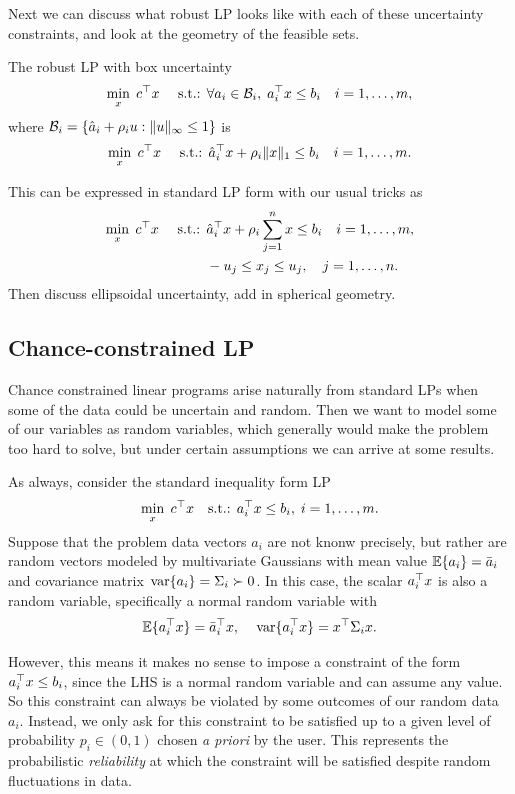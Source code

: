 \documentclass[11 pt]{scrartcl}
\begin{document}
Next we can discuss what robust LP looks like with each of these uncertainty constraints, and look at the geometry of the feasible sets. 

The robust LP with box uncertainty 
\begin{align*}
    \min_x\; c^\top x \quad\text{ s.t.: } \forall a_i\in \mathcal B_i,\; a_i^\top x \leq b_i \quad i = 1,\dots, m,
\end{align*}
where $\mathcal B_i = \{\hat{a}_i + \rho_i u : \|u\|_\infty \leq 1\}$ is 
\begin{align*}
    \min_x\; c^\top x \quad\text{ s.t.: } \hat{a}_i^\top x + \rho_i\|x\|_1 \leq b_i \quad i = 1,\dots, m.
\end{align*}

This can be expressed in standard LP form with our usual tricks as 
\begin{align*}
    \min_x\; c^\top x \quad\text{ s.t.: } &\hat{a}_i^\top x + \rho_i\sum_{j=1}^nx \leq b_i \quad i = 1,\dots, m, \\
                                        & -u_j \leq x_j \leq u_j, \quad j = 1, \dots, n.
\end{align*}
Then discuss ellipsoidal uncertainty, add in spherical geometry.

\subsection{Chance-constrained LP}
Chance constrained linear programs arise naturally from standard LPs when some of the data could be uncertain and random. 
Then we want to model some of our variables as random variables, which generally would make the problem too hard to solve, but under certain assumptions we can arrive at some results.

As always, consider the standard inequality form LP 
\[ \min_x\; c^\top x \quad \text{s.t.: } a_i^\top x \leq b_i, \; i = 1,\dots, m.\] 
Suppose that the problem data vectors $a_i$ are not knonw precisely, but rather are random vectors modeled by multivariate Gaussians with mean value $\mathbb E\{a_i\} = \bar{a}_i$ and covariance matrix $\,\text{var}\{a_i\} = \Sigma_i \succ 0$. 
In this case, the scalar $a_i^\top x$ is also a random variable, specifically a normal random variable with 
\[ \mathbb E\{a_i^\top x\} = \bar{a}_i^\top x, \quad \,\text{var}\{a_i^\top x\} = x^\top \Sigma_i x.\] 

However, this means it makes no sense to impose a constraint of the form $a_i^\top x\leq b_i$, since the LHS is a normal random variable and can assume any value. 
So this constraint can always be violated by some outcomes of our random data $a_i$. 
Instead, we only ask for this constraint to be satisfied up to a given level of probability $p_i \in (0,1)$ chosen \emph{a priori} by the user. 
This represents the probabilistic \emph{reliability} at which the constraint will be satisfied despite random fluctuations in data. 
\end{document}

